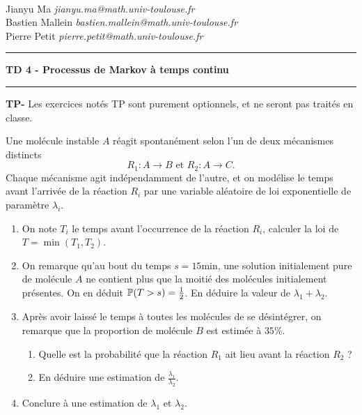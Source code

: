 \documentclass[]{exercices}
\begin{document}
{
\\
Jianyu Ma \hfill \textit{jianyu.ma@math.univ-toulouse.fr}\\
Bastien Mallein \hfill \textit{bastien.mallein@math.univ-toulouse.fr}\\
Pierre Petit \hfill \textit{pierre.petit@math.univ-toulouse.fr}}


\vspace{2ex}

 \hrule
\begin{center}
\textbf{\large TD 4 - Processus de Markov à temps continu}
\vspace{2ex}
\end{center}
\hrule

\bigskip

\textbf{TP-} Les exercices notés TP sont purement optionnels, et ne seront pas traités en classe.

\begin{exercice}
Une molécule instable $A$ réagit spontanément selon l'un de deux mécanismes distincts
\[
  R_1 : A \longrightarrow B \text{ et } R_2 : A \longrightarrow C.
\]
Chaque mécanisme agit indépendamment de l'autre, et on modélise le temps avant l'arrivée de la réaction $R_i$ par une variable aléatoire de loi exponentielle de paramètre $\lambda_i$.
\begin{enumerate}
  \item On note $T_i$ le temps avant l'occurrence de la réaction $R_i$, calculer la loi de $T = \min(T_1,T_2)$.
  \item On remarque qu'au bout du temps $s = 15\text{min}$, une solution initialement pure de molécule $A$ ne contient plus que la moitié des molécules initialement présentes. On en déduit $\P(T > s) = \frac{1}{2}$. En déduire la valeur de $\lambda_1 + \lambda_2$.
  \item Après avoir laissé le temps à toutes les molécules de se désintégrer, on remarque que la proportion de molécule $B$ est estimée à $35\%$.
  \begin{enumerate}
    \item Quelle est la probabilité que la réaction $R_1$ ait lieu avant la réaction $R_2$ ?
    \item En déduire une estimation de $\frac{\lambda_1}{\lambda_2}$.
  \end{enumerate}
  \item Conclure à une estimation de $\lambda_1$ et $\lambda_2$.
\end{enumerate}
\end{exercice}
\end{document}
